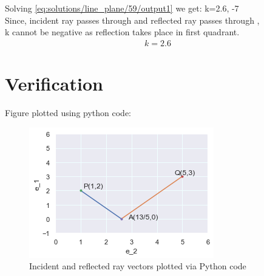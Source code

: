 Solving \eqref{eq:solutions/line_plane/59/output1} we get:
 k=2.6, -7 
 \\
 Since, incident ray passes through  and reflected ray passes through ,\\
 k cannot be negative as reflection takes place in first quadrant.
\begin{align}
   k=2.6
\end{align}
\section{Verification}
Figure plotted using python code:
\begin{figure}[h]
\centering
\includegraphics[width=\columnwidth]{./solutions/line_plane/59/output.png}
\caption{Incident and reflected ray vectors plotted via Python code}
\label{fig:solutions/line_plane/59/output1}
\end{figure}
